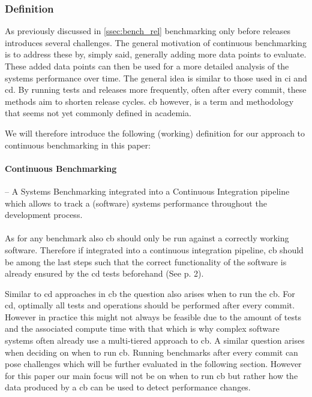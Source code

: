 \documentclass[	runningheads,
				a4paper]{llncs}
\begin{document}
	\subsubsection{Definition}
	As previously discussed in \autoref{ssec:bench_rel} benchmarking only before releases introduces several challenges. The general motivation of continuous benchmarking is to address these by, simply said, generally adding more data points to evaluate. These added data points can then be used for a more detailed analysis of the systems performance over time. The general idea is similar to those used in \gls{ci} and \gls{cd}. By running tests and releases more frequently, often after every commit, these methods aim to shorten release cycles. \gls{cb} however, is a term and methodology that seems not yet commonly defined in academia.

	We will therefore introduce the following (working) definition for our approach to continuous benchmarking in this paper:
	\paragraph{Continuous Benchmarking} -- A Systems Benchmarking integrated into a Continuous Integration pipeline which allows to track a (software) systems performance throughout the development process.

	\paragraph{}As for any benchmark also \gls{cb} should only be run against a correctly working software. Therefore if integrated into a continuous integration pipeline, \gls{cb} should be among the last steps such that the correct functionality of the software is already ensured by the \gls{cd} tests beforehand (See \cite{grambow2019} p. 2).

	Similar to \gls{cd} approaches in \gls{cb} the question also arises when to run the \gls{cb}. For \gls{cd}, optimally all tests and operations should be performed after every commit. However in practice this might not always be feasible due to the amount of tests and the associated compute time with that which is why complex software systems often already use a multi-tiered approach to \gls{cb}. A similar question arises when deciding on when to run \gls{cb}. Running benchmarks after every commit can pose challenges which will be further evaluated in the following section. However for this paper our main focus will not be on when to run \gls{cb} but rather how the data produced by a \gls{cb} can be used to detect performance changes.
\end{document}
